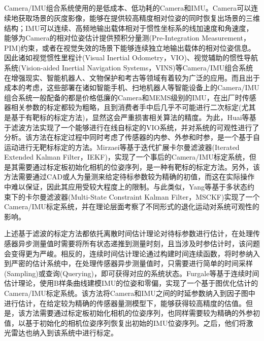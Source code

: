 \subsection{}
Camera/IMU组合系统使用的是低成本、低功耗的Camera和IMU。Camera可以连续地获取场景的灰度影像，能够在提供较高精度相对位姿的同时恢复出场景的三维结构；IMU可以连续、高频地输出载体相对于惯性坐标系的线加速度和角速度，能够为Camera的相对位姿估计提供预积分量测(Pre-Integration Measurement，PIM)约束\cite{qin2018vins}，或者在视觉失效的场景下能够连续独立地输出载体的相对位姿信息。因此诸如视觉惯性里程计(Visual Inertial Odometry，VIO)、视觉辅助的惯性导航系统(Vision-aided Inertial Navigation Systems，VINS)等Camera/IMU组合系统在增强现实、智能机器人、文物保护和考古等领域有着较为广泛的应用。而且出于成本的考虑，这些部署在诸如智能手机、扫地机器人等智能设备上的Camera/IMU组合系统一般配备的都是价格低廉的Camera和MEMS级别的IMU，在出厂时传感器相关参数的标定都较为粗略，且到消费者手中后几乎不可能进行二次标定(尤其是基于有靶标的标定方法)，显然这会严重损害相关算法的精度。为此，Huai等\cite{huai2022observability}基于滤波方法实现了一个能够进行在线自标定的VIO系统，并对系统的可观性进行了分析。该方法在标定过程中同时考虑了传感器的内参、外参和时参，是一个基于自运动进行无靶标标定的方法。Mirzaei等\cite{mirzaei2008kalman}基于迭代扩展卡尔曼滤波器(Iterated Extended Kalman Filter，IEKF)，实现了一个事后的Camera/IMU标定系统，但是其需要通过标定板初始化相机的位姿序列，是一种有靶标的标定方法。另外，该方法需要通过CAD或人为量测来给定待标参数较为精确的初值，而这在实际操作中难以保证，因此其应用受较大程度上的限制。与此类似，Yang等\cite{yang2019degenerate}基于多状态约束下的卡尔曼滤波器(Multi-State Constraint Kalman Filter，MSCKF)实现了一个Camera/IMU标定系统，并在理论层面考察了不同形式的退化运动对系统可观性的影响。

上述基于滤波的标定方法都依托离散时间估计理论对待标参数进行估计，在处理传感器异步测量值时需要将所有状态递推到测量时刻，且当涉及时参估计时，该问题会变得更为严峻。相反的，连续时间估计理论通过构建时间连续函数，将时参纳入到严密的估计系统中，在处理传感器异步测量值时，只需要进行简单的时间采样(Sampling)或查询(Querying)，即可获得对应的系统状态。Furgale等\cite{furgale2013unified}基于连续时间估计理论，使用B样条曲线建模IMU的位姿和零偏，实现了一个基于图优化估计的Camera/IMU标定系统。该方法将Camera和IMU之间的时延参数纳入到因子图中进行估计，在给定较为精确的传感器量测模型下，能够获得较高精度的估值。但是，该方法需要通过标定板初始化相机的位姿序列，也同样需要较为精确的外参初值，以基于初始化的相机位姿序列恢复出初始的IMU位姿序列。之后，他们将激光雷达也纳入到该系统中进行标定\cite{rehder2014spatio}。

